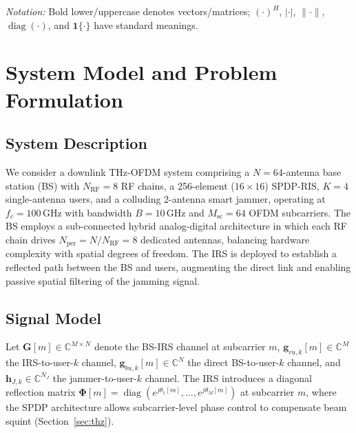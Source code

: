 \documentclass[journal,twocolumn]{IEEEtran}
\newcommand{\vect}[1]{\mathbf{#1}}
\newcommand{\mat}[1]{\mathbf{#1}}
\newcommand{\C}{\mathbb{C}}
\DeclareMathOperator{\diag}{diag}
\begin{document}
\emph{Notation:} Bold lower/uppercase denotes vectors/matrices; $(\cdot)^H$, $|\cdot|$, $\|\cdot\|$, $\diag(\cdot)$, and $\mathbf{1}\{\cdot\}$ have standard meanings.

\section{System Model and Problem Formulation}
\label{sec:system}

\subsection{System Description}

We consider a downlink THz-OFDM system comprising a $N=64$-antenna base station (BS) with $N_{\text{RF}}=8$ RF chains, a 256-element ($16\!\times\!16$) SPDP-RIS, $K=4$ single-antenna users, and a colluding 2-antenna smart jammer, operating at $f_c=100\,\text{GHz}$ with bandwidth $B=10\,\text{GHz}$ and $M_{\text{sc}}=64$ OFDM subcarriers. The BS employs a sub-connected hybrid analog-digital architecture in which each RF chain drives $N_{\text{per}}=N/N_{\text{RF}}=8$ dedicated antennas, balancing hardware complexity with spatial degrees of freedom. The IRS is deployed to establish a reflected path between the BS and users, augmenting the direct link and enabling passive spatial filtering of the jamming signal.

\subsection{Signal Model}

Let $\mat{G}[m] \in \C^{M \times N}$ denote the BS-IRS channel at subcarrier $m$, $\vect{g}_{ru,k}[m] \in \C^{M}$ the IRS-to-user-$k$ channel, $\vect{g}_{bu,k}[m] \in \C^{N}$ the direct BS-to-user-$k$ channel, and $\vect{h}_{J,k} \in \C^{N_J}$ the jammer-to-user-$k$ channel. The IRS introduces a diagonal reflection matrix $\bm{\Phi}[m] = \diag(e^{j\theta_1[m]}, \ldots, e^{j\theta_M[m]})$ at subcarrier $m$, where the SPDP architecture allows subcarrier-level phase control to compensate beam squint (Section~\ref{sec:thz}).
\end{document}
